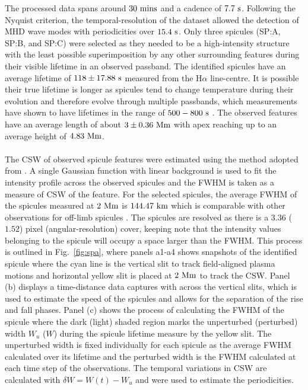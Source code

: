 \documentclass[12pt]{ociamthesis}
\newcommand{\np}{\\ \\}
\begin{document}
%
The processed data spans around $30~\rm{mins}$ and a cadence of $7.7~\rm{s}$. Following the Nyquist criterion, the temporal-resolution of the dataset allowed the detection of MHD wave modes with periodicities over $15.4~\rm{s}$. Only three spicules (SP:A, SP:B, and SP:C) were selected as they needed to be a high-intensity structure with the least possible superimposition by any other surrounding features during their visible lifetime in an observed passband. The identified spicules have an average lifetime of $118\pm 17.88~\rm{s}$ measured from the H$\alpha$ line-centre. It is possible their true lifetime is longer as spicules tend to change temperature during their evolution and therefore evolve through multiple passbands, which measurements have shown to have lifetimes in the range of $500-800~\rm{s}$ \citep{Pereira2014}. The observed features have an average length of about $3\pm0.36~\rm{Mm}$ with apex reaching up to an average height of $4.83~\rm{Mm}$. \np
%
The CSW of observed spicule features were estimated using the method adopted from \citet{Sharma2018}. A single Gaussian function with linear background is used to fit the intensity profile across the observed spicules and the FWHM is taken as a measure of CSW of the feature. For the selected spicules, the average FWHM of the spicules measured at $2~\rm{Mm}$ is $144.47~\rm{km}$ which is comparable with other observations for off-limb spicules \citep{Sharma2018}. The spicules are resolved as there is a $3.36$ ($1.52$) pixel (angular-resolution) cover, keeping note that the intensity values belonging to the spicule will occupy a space larger than the FWHM. This process is outlined in Fig.~\ref{fig:spa}, where panels a1-a4 shows snapshots of the identified spicule where the cyan line is the vertical slit to track field-aligned plasma motions and horizontal yellow slit is placed at $2~\rm{Mm}$ to track the CSW. Panel (b) displays a time-distance data captures with across the vertical slits, which is used to estimate the speed of the spicules and allows for the separation of the rise and fall phases. Panel (c) shows the process of calculating the FWHM of the spicule where the dark (light) shaded region marks the unperturbed (perturbed) width $W_u$ ($W$) during the spicule lifetime measure by the yellow slit. The unperturbed width is fixed individually for each spicule as the average FWHM calculated over its lifetime and the perturbed width is the FWHM calculated at each time step of the observations. The temporal variations in CSW are calculated with $\delta W = W(t) - W_{u}$ and were used to estimate the periodicities. \np
\end{document}
